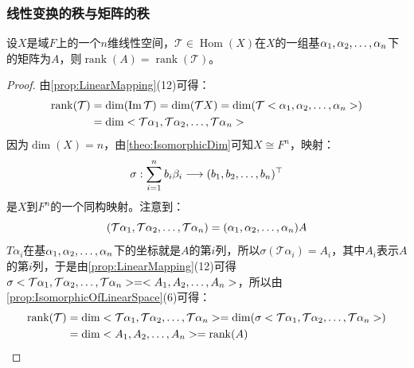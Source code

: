 \subsubsection{线性变换的秩与矩阵的秩}
\begin{theorem}\label{theo:LinearTransformationRank}
	设$X$是域$F$上的一个$n$维线性空间，$\mathcal{T}\in\operatorname{Hom}(X)$在$X$的一组基$\alpha_1, \alpha_2, \dots, \alpha_{n}$下的矩阵为$A$，则$\operatorname{rank}(A)=\operatorname{rank}(\mathcal{T})$。
\end{theorem}
\begin{proof}
	由\cref{prop:LinearMapping}(12)可得：
	\begin{align*}
		\operatorname{rank}(\mathcal{T})&=\dim(\operatorname{Im}\mathcal{T})=\dim(\mathcal{T}X)=\dim(\mathcal{T}<\alpha_1, \alpha_2, \dots, \alpha_{n}>) \\
		&=\dim<\mathcal{T}\alpha_1, \mathcal{T}\alpha_2, \dots, \mathcal{T}\alpha_{n}>
	\end{align*}
	因为$\dim(X)=n$，由\cref{theo:IsomorphicDim}可知$X\cong F^n$，映射：
	\begin{equation*}
		\sigma:\sum_{i=1}^{n}b_i\beta_i\longrightarrow(b_1, b_2, \dots, b_{n})^{\top}
	\end{equation*}
	是$X$到$F^n$的一个同构映射。注意到：
	\begin{equation*}
		(\mathcal{T}\alpha_1, \mathcal{T}\alpha_2, \dots, \mathcal{T}\alpha_{n})=(\alpha_1, \alpha_2, \dots, \alpha_{n})A
	\end{equation*}
	$T\alpha_i$在基$\alpha_1, \alpha_2, \dots, \alpha_{n}$下的坐标就是$A$的第$i$列，所以$\sigma(\mathcal{T}\alpha_i)=A_i$，其中$A_i$表示$A$的第$i$列，于是由\cref{prop:LinearMapping}(12)可得$\sigma<\mathcal{T}\alpha_1, \mathcal{T}\alpha_2, \dots, \mathcal{T}\alpha_{n}>=<A_1, A_2, \dots, A_{n}>$，所以由\cref{prop:IsomorphicOfLinearSpace}(6)可得：
	\begin{align*}
		\operatorname{rank}(\mathcal{T})&=\dim<\mathcal{T}\alpha_1, \mathcal{T}\alpha_2, \dots, \mathcal{T}\alpha_{n}>=\dim(\sigma<\mathcal{T}\alpha_1, \mathcal{T}\alpha_2, \dots, \mathcal{T}\alpha_{n}>) \\
		&=\dim<A_1, A_2, \dots, A_{n}>=\operatorname{rank}(A)\qedhere
	\end{align*}
\end{proof}
